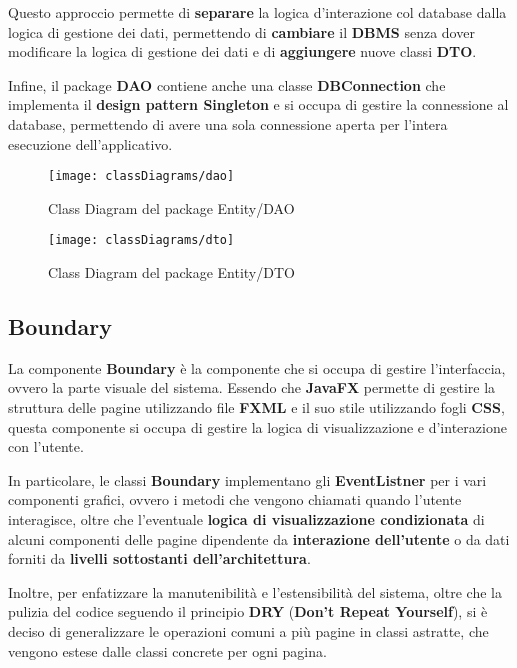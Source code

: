 Questo approccio permette di \textbf{separare} la logica d'interazione col database dalla
logica di gestione dei dati, permettendo di \textbf{cambiare} il \textbf{DBMS} senza dover
modificare la logica di gestione dei dati e di \textbf{aggiungere} nuove classi \textbf{DTO}.

Infine, il package \textbf{DAO} contiene anche una classe \textbf{DBConnection} che
implementa il \textbf{design pattern Singleton} e si occupa di gestire la connessione
al database, permettendo di avere una sola connessione aperta per l'intera esecuzione
dell'applicativo.

\newpage
\begin{figure}[H]
  \centering
  \texttt{[image: classDiagrams/dao]}
  \caption{Class Diagram del package Entity/DAO}
\end{figure}

\begin{figure}
  \centering
  \texttt{[image: classDiagrams/dto]}
  \caption{Class Diagram del package Entity/DTO}
\end{figure}

\newpage

\subsection{Boundary}

La componente \textbf{Boundary} è la componente che si occupa di gestire l'interfaccia,
ovvero la parte visuale
 del sistema. Essendo che \textbf{JavaFX} permette di gestire
la struttura delle pagine utilizzando file \textbf{FXML} e il suo stile utilizzando fogli
\textbf{CSS}, questa componente si occupa di gestire la logica di visualizzazione
 e d'interazione con l'utente.

In particolare, le classi \textbf{Boundary} implementano gli \textbf{EventListner} per i vari
componenti grafici, ovvero i metodi che vengono chiamati quando l'utente interagisce, 
oltre che l'eventuale \textbf{logica di visualizzazione condizionata} di alcuni componenti 
delle pagine dipendente da \textbf{interazione dell'utente} o da dati forniti da 
\textbf{livelli sottostanti dell'architettura}.

Inoltre, per enfatizzare la manutenibilità e l'estensibilità del sistema, oltre che la pulizia
del codice seguendo il principio \textbf{DRY} (\textbf{Don't Repeat Yourself}), si è 
deciso di generalizzare le operazioni comuni a più pagine in classi astratte, che
vengono estese dalle classi concrete per ogni pagina.


